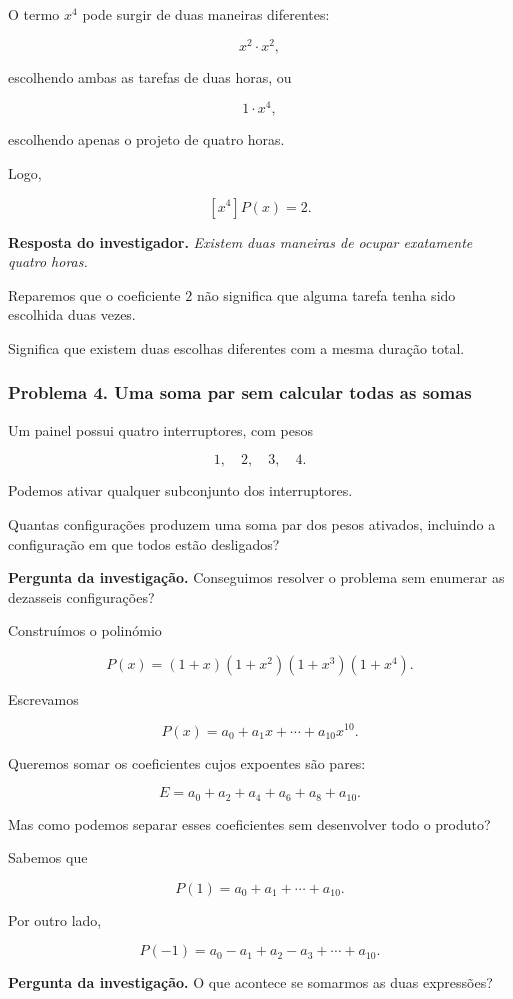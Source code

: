 \documentclass[11pt,a4paper,oneside]{book}
\newcommand{\Pergunta}[1]{\begin{perguntabox}\textbf{Pergunta da investigação.} #1\end{perguntabox}}
\newcommand{\Resposta}[1]{\textcolor{verdeescuro}{\textbf{Resposta do investigador.}} \emph{#1}\par}
\begin{document}
O termo $x^4$ pode surgir
de duas maneiras diferentes:

\[
x^2\cdot x^2,
\]

escolhendo ambas as tarefas de duas horas,
ou

\[
1\cdot x^4,
\]

escolhendo apenas o projeto
de quatro horas.

Logo,

\[
[x^4]P(x)=2.
\]

\Resposta{Existem duas maneiras
de ocupar exatamente quatro horas.}

Reparemos que o coeficiente $2$
não significa que alguma tarefa
tenha sido escolhida duas vezes.

Significa que existem duas escolhas
diferentes com a mesma duração total.

\subsubsection*{Problema 4. Uma soma par sem calcular todas as somas}

Um painel possui quatro interruptores,
com pesos

\[
1,\quad2,\quad3,\quad4.
\]

Podemos ativar qualquer subconjunto
dos interruptores.

Quantas configurações produzem
uma soma par dos pesos ativados,
incluindo a configuração em que
todos estão desligados?

\Pergunta{Conseguimos resolver o problema
sem enumerar as dezasseis configurações?}

Construímos o polinómio

\[
P(x)=
(1+x)(1+x^2)(1+x^3)(1+x^4).
\]

Escrevamos

\[
P(x)=a_0+a_1x+\cdots+a_{10}x^{10}.
\]

Queremos somar os coeficientes
cujos expoentes são pares:

\[
E=a_0+a_2+a_4+a_6+a_8+a_{10}.
\]

Mas como podemos separar esses
coeficientes sem desenvolver
todo o produto?

Sabemos que

\[
P(1)=a_0+a_1+\cdots+a_{10}.
\]

Por outro lado,

\[
P(-1)=a_0-a_1+a_2-a_3+\cdots+a_{10}.
\]

\Pergunta{O que acontece se somarmos
as duas expressões?}
\end{document}
